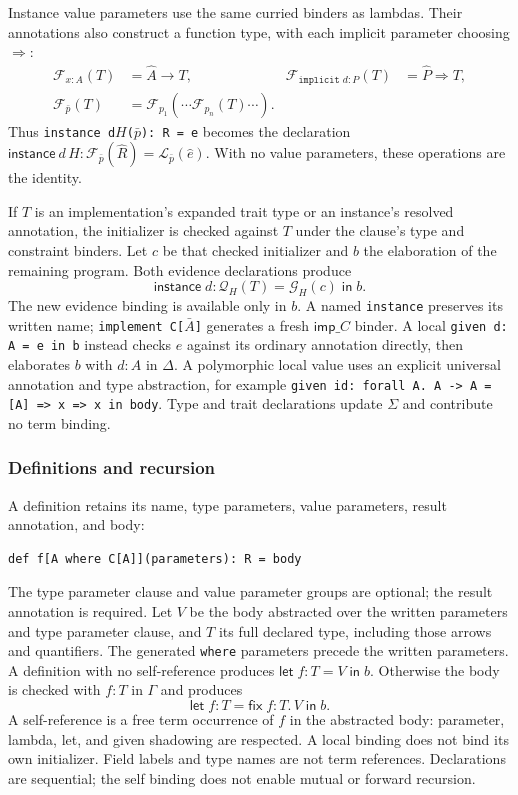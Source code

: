 \documentclass[10pt,a4paper]{article}
\newcommand{\fix}[3]{\mathsf{fix}\;#1:#2.\,#3}
\newcommand{\letin}[3]{\mathsf{let}\;#1=#2\;\mathsf{in}\;#3}
\newcommand{\instancelet}[4]{\mathsf{instance}\;#1:#2=#3\;\mathsf{in}\;#4}
\newcommand{\kw}[1]{\mathsf{#1}}
\begin{document}
Instance value parameters use the same curried binders as lambdas. Their annotations
also construct a function type, with each implicit parameter choosing $\Rightarrow$:
\[
\begin{aligned}
\mathcal F_{x:A}(T)&=\hat A\to T,&
\mathcal F_{\texttt{implicit }d:P}(T)&=\hat P\Rightarrow T,\\
\mathcal F_{\bar p}(T)&=\mathcal F_{p_1}(\cdots\mathcal F_{p_n}(T)\cdots).
\end{aligned}
\]
Thus \texttt{instance d}$H$\texttt{(}$\bar p$\texttt{): R = e} becomes the declaration
$\kw{instance}\ d\,H:\mathcal F_{\bar p}(\hat R)=\mathcal L_{\bar p}(\hat e)$.
With no value parameters, these operations are the identity.

If $T$ is an implementation's expanded trait type or an instance's resolved annotation,
the initializer is checked against $T$ under the clause's type and constraint binders.
Let $c$ be that checked initializer and $b$ the elaboration of the remaining program.
Both evidence declarations produce
\[
 \instancelet{d}{\mathcal Q_H(T)}{\mathcal G_H(c)}{b}.
\]
The new evidence binding is available only in $b$. A named \texttt{instance}
preserves its written name; \texttt{implement C[}$\bar A$\texttt{]} generates a
fresh $\kw{imp\_}C$ binder. A local \texttt{given d: A = e in b}
instead checks $e$ against its ordinary annotation directly, then elaborates $b$ with
$d:A$ in $\Delta$. A polymorphic local value uses an explicit universal annotation and
type abstraction, for example \texttt{given id: forall A. A -> A = [A] => x => x in body}.
Type and trait declarations update $\Sigma$ and contribute no term binding.

\subsubsection*{Definitions and recursion}
A definition retains its name, type parameters, value parameters, result annotation, and body:
\begin{lstlisting}
def f[A where C[A]](parameters): R = body
\end{lstlisting}
The type parameter clause and value parameter groups are optional; the result annotation is required.
Let $V$ be the body abstracted over the written parameters and type parameter clause, and $T$ its
full declared type, including those arrows and quantifiers. The generated \texttt{where}
parameters precede the written parameters. A definition with no self-reference produces
$\letin{f:T}{V}{b}$. Otherwise the body is checked with $f:T$ in $\Gamma$ and produces
\[
 \letin{f:T}{\fix{f}{T}{V}}{b}.
\]
A self-reference is a free term occurrence of $f$ in the abstracted body: parameter,
lambda, let, and given shadowing are respected. A local binding does not bind its
own initializer. Field labels and type names are not term references. Declarations
are sequential; the self binding does not enable mutual or forward recursion.
\end{document}

